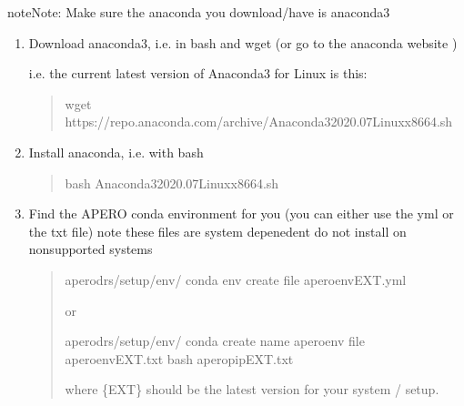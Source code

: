 \documentclass[a4paper,10pt,english]{report}
\begin{document}
\begin{sphinxadmonition}{note}{Note:}
Make sure the anaconda you download/have is anaconda3
\end{sphinxadmonition}
\begin{enumerate}
%
\item {} 
Download anaconda3, i.e. in bash and wget (or go to the
anaconda website )

i.e. the current latest version of Anaconda3 for Linux is this:
\begin{quote}

\begin{sphinxVerbatim}[commandchars=\\\{\}]
wget https://repo.anaconda.com/archive/Anaconda3\PYGZhy{}2020.07\PYGZhy{}Linux\PYGZhy{}x86\PYGZus{}64.sh
\end{sphinxVerbatim}
\end{quote}

\item {} 
Install anaconda, i.e. with bash
\begin{quote}

\begin{sphinxVerbatim}[commandchars=\\\{\}]
bash Anaconda3\PYGZhy{}2020.07\PYGZhy{}Linux\PYGZhy{}x86\PYGZus{}64.sh
\end{sphinxVerbatim}
\end{quote}

\item {} 
Find the APERO conda environment for you (you can either use the yml or the
txt file) \sphinxhyphen{} note these files are system depenedent \sphinxhyphen{} do not install on
non\sphinxhyphen{}supported systems
\begin{quote}

\begin{sphinxVerbatim}[commandchars=\\\{\}]
 apero\PYGZhy{}drs/setup/env/
conda env create \PYGZhy{}\PYGZhy{}file apero\PYGZhy{}env\PYGZhy{}EXT.yml
\end{sphinxVerbatim}

or

\begin{sphinxVerbatim}[commandchars=\\\{\}]
 apero\PYGZhy{}drs/setup/env/
conda create \PYGZhy{}\PYGZhy{}name apero\PYGZhy{}env \PYGZhy{}\PYGZhy{}file apero\PYGZhy{}env\PYGZhy{}EXT.txt
bash apero\PYGZhy{}pip\PYGZhy{}EXT.txt
\end{sphinxVerbatim}

where \{EXT\} should be the latest version for your system / setup.
\end{quote}

\end{enumerate}
\end{document}

